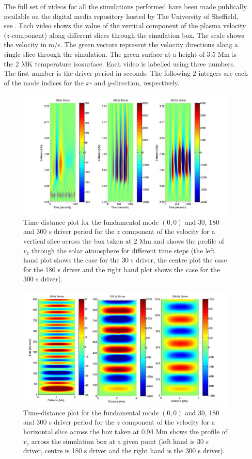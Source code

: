 \documentclass[preprint,authoryear,12pt]{elsarticle}
\begin{document}
The full set of videos for all the simulations performed have been made publically available on the digital media repository hosted by The University of Sheffield, see \citet{Griffiths2017}. Each video shows the value of the vertical component of the plasma velocity ($z$-component) along different slices through the simulation box. The scale shows the velocity in m/s. The green vectors represent the velocity directions along a single slice through the simulation. The green surface at a height of 3.5 Mm is the 2 MK temperature isosurface. 
Each video is labelled using three numbers. The first number is the driver period in seconds. The following 2 integers are each of the mode indices for the $x$- and $y$-direction, respectively.
\begin{figure}[h]
\includegraphics[scale=1.8]{imrescale/fig2_dt_30_180_300_0_vert_2Mm.jpg}
\caption{Time-distance plot for the fundamental mode $(0,0)$ and 30, 180 and 300 s driver period for the $z$ component of the velocity for a vertical slice across the box  taken at 2 Mm and shows  the profile of $v_{z}$ through the solar atmosphere for different time steps (the left hand plot shows the case for the 30 s driver, the centre plot the case for the 180 s driver and the right hand plot shows the case for the 300 s  driver). }
\label{Fig3}
\end{figure}
\begin{figure}[h]
\includegraphics[scale=1]{imrescale/fig3_dt_30_180_300_0_horiz_p94Mm.jpg}
\caption{Time-distance plot for the fundamental mode $(0,0)$  and 30, 180 and 300 s driver period for the $z$ component of the velocity for a horizontal slice across the box  taken at 0.94 Mm shows  the profile of $ v_{z}$ across the simulation box at a given point (left hand is 30 s driver, centre is 180 s driver and the right hand is the 300 s driver). }
\label{Fig4}
\end{figure}
\end{document}
